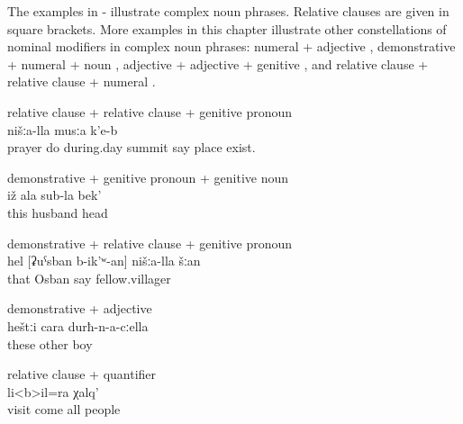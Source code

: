 The examples in - illustrate complex noun phrases. Relative clauses are given in square brackets. More examples in this chapter illustrate other constellations of nominal modifiers in complex noun phrases: numeral + adjective , demonstrative + numeral + noun , adjective + adjective + genitive , and relative clause + relative clause + numeral .
%
\begin{exe}
		\ex	relative clause + relative clause + genitive pronoun\\	\label{ex:There is our place, called the midday summit, the praying summit@10a}
			nišːa-lla	musːa	k'e-b\\
			prayer	do	during.day	summit	say		place	exist.\\
		\glt	{}

		\ex	demonstrative + genitive pronoun + genitive noun\\	\label{ex:your husband's head@10b}
		\gll	iž	ala	sub-la	bek'\\
			this		husband	head\\
		\glt	{}

		\ex	demonstrative + relative clause + genitive pronoun\\	\label{ex:that our fellow villager called Osban}
		\gll	hel	[ʡuˁsban	b-ik'ʷ-an]	nišːa-lla	šːan\\
			that	Osban	say		fellow.villager\\
		\glt	{}


		\ex	demonstrative + adjective\\				\label{ex:with these other boys}
		\gll	heštːi	cara	durħ-n-a-cːella\\
			these	other	boy\\
		\glt	{}
		
				\ex	relative clause + quantifier\\		\label{ex:all people who had come for a visit@11b}
		\gll	[šːatːir	sa-b-ač'-ib-te]	li<b>il=ra	χalq'\\
			visit	come 	all	people\\
		\glt	{}

\end{exe}

